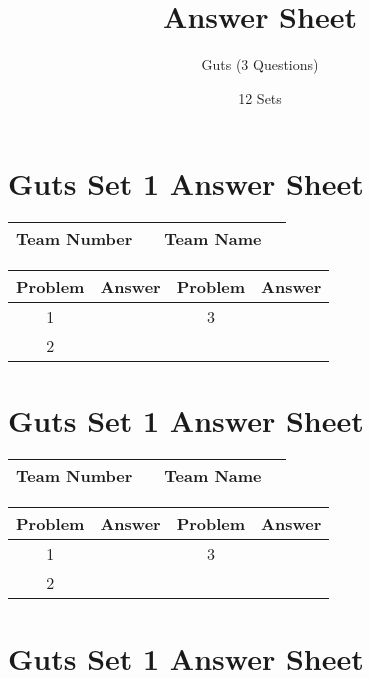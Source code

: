 \documentclass[14pt]{article}
\title{Answer Sheet}
\author{Guts (3 Questions)}
\date{12 Sets}
\begin{document}
\section*{Guts Set 1 Answer Sheet}

\begin{center}
\begin{tabular}{|r|r|r|r|}
\hline
	Team Number & \hspace{10em} &
	Team Name & \hspace{15em} \\ \hline
\end{tabular}
\end{center}
\begin{tabularx}{\textwidth}{|c|l|c|X|}\hline
	Problem & Answer & Problem & Answer \\\hline
	1 & \hspace{15em} & 3 & \\\hline
	2 & & & \\\hline
\end{tabularx}

\vspace{30px}

\section*{Guts Set 1 Answer Sheet}

\begin{center}
\begin{tabular}{|r|r|r|r|}
\hline
	Team Number & \hspace{10em} &
	Team Name & \hspace{15em} \\ \hline
\end{tabular}
\end{center}
\begin{tabularx}{\textwidth}{|c|l|c|X|}\hline
	Problem & Answer & Problem & Answer \\\hline
	1 & \hspace{15em} & 3 & \\\hline
	2 & & & \\\hline
\end{tabularx}

\vspace{30px}

\section*{Guts Set 1 Answer Sheet}
\end{document}
